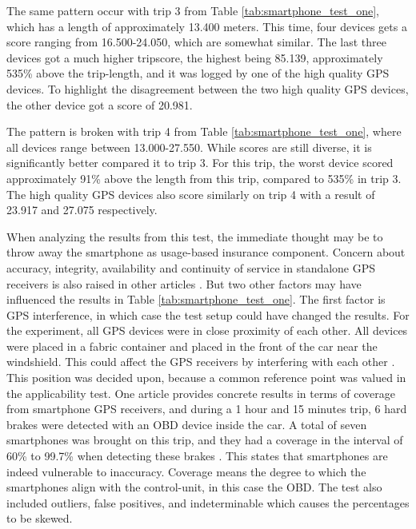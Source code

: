 The same pattern occur with trip 3 from Table \ref{tab:smartphone_test_one}, which has a length of approximately 13.400 meters. This time, four devices gets a score ranging from 16.500-24.050, which are somewhat similar. The last three devices got a much higher tripscore, the highest being 85.139, approximately 535\% above the trip-length, and it was logged by one of the high quality GPS devices. To highlight the disagreement between the two high quality GPS devices, the other device got a score of 20.981. 

The pattern is broken with trip 4 from Table \ref{tab:smartphone_test_one}, where all devices range between 13.000-27.550. While scores are still diverse, it is significantly better compared it to trip 3. For this trip, the worst device scored approximately 91\% above the length from this trip, compared to 535\% in trip 3. The high quality GPS devices also score similarly on trip 4 with a result of 23.917 and 27.075 respectively. 

When analyzing the results from this test, the immediate thought may be to throw away the smartphone as usage-based insurance component. Concern about accuracy, integrity, availability and continuity of service in standalone GPS receivers is also raised in other articles \citep{art:challenges_smartphone_ubi} \citep{art:survey_mobile_phone_sensing} \citep{art:smartphones_for_monitoring_and_ubi} \citep{art:insurtelematics} \citep{art:in-car_positioning_technologies}. But two other factors may have influenced the results in Table \ref{tab:smartphone_test_one}. The first factor is GPS interference, in which case the test setup could have changed the results. For the experiment, all GPS devices were in close proximity of each other. All devices were placed in a fabric container and placed in the front of the car near the windshield. This could affect the GPS receivers by interfering with each other \citep{art:gps_interference_two} \citep{art:gps_interference_one}. This position was decided upon, because a common reference point was valued in the applicability test. One article provides concrete results in terms of coverage from smartphone GPS receivers, and during a 1 hour and 15 minutes trip, 6 hard brakes were detected with an OBD device inside the car. A total of seven smartphones was brought on this trip, and they had a coverage in the interval of 60\% to 99.7\% when detecting these brakes \citep{art:insurtelematics}. This states that smartphones are indeed vulnerable to inaccuracy. Coverage means the degree to which the smartphones align with the control-unit, in this case the OBD. The test also included outliers, false positives, and indeterminable which causes the percentages to be skewed.

